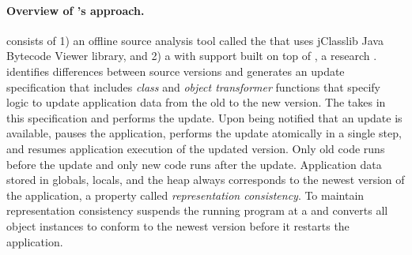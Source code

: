 

\paragraph{Overview of \JV's approach.}
\JV consists of 1) an offline source analysis tool called the \UPT that
uses
jClasslib Java Bytecode Viewer library, and 2) a \JVM with
\USD support built on top of \RVM, a research \VM. \UPT identifies differences
between source versions and generates an update specification that includes
\emph{class} and \emph{object transformer} functions that specify logic to
update application data from the old to the new version.
The \JV \VM takes in this specification and performs the update.  Upon being
notified that an update is available, \JV pauses the application, performs
the update atomically in a single step, and resumes application execution
of the updated version. Only old code runs before the update and only new code
runs after the update. Application data stored in globals, locals, and the
heap always corresponds to the newest version of the application, a property
called {\em representation consistency}.
To maintain representation consistency \JV suspends the running program at
a \DSP and converts all object instances to conform to the newest version
before it restarts the application.

